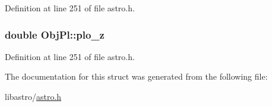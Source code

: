 Definition at line 251 of file astro.\-h.

\hypertarget{struct_obj_pl_acd4ef2a16d86c17de03a5da0f8fa6a6a}{
\subsubsection[{plo\-\_\-z}]{\setlength{\rightskip}{0pt plus 5cm}double Obj\-Pl\-::plo\-\_\-z}}\label{struct_obj_pl_acd4ef2a16d86c17de03a5da0f8fa6a6a}


Definition at line 251 of file astro.\-h.



The documentation for this struct was generated from the following file\-:\begin{DoxyCompactItemize}
\item 
libastro/\hyperlink{astro_8h}{astro.\-h}\end{DoxyCompactItemize}
